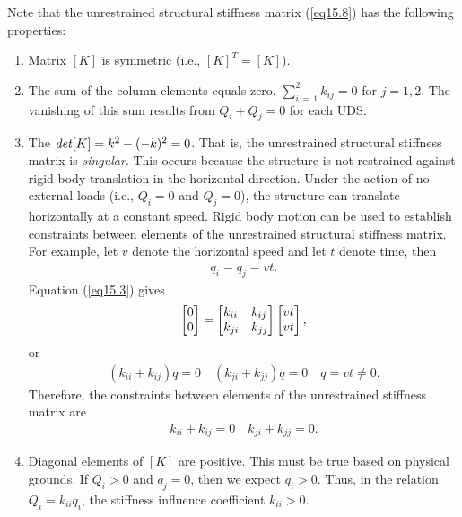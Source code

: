 \documentclass{AeroStructure-ERJohnson}
\begin{document}
Note that the unrestrained structural stiffness matrix (\ref{eq15.8}) has the following properties:
\begin{enumerate}
  \item Matrix $[K]$ is symmetric (i.e., $[K]^{T}=[K]$).
  \item The sum of the column elements equals zero. $\sum\limits_{i\,=\,1}^2 k_{i j}=0$ for $j=1,2$. The vanishing of this sum results from $Q_{i}+Q_{j}=0$ for each UDS.
  \item The ${\it det}[K]=k^{2}-(-k)^{2}=0$. That is, the unrestrained structural stiffness matrix is \textit{singular}. This occurs because the structure is not restrained against rigid body translation in the horizontal direction.
Under the action of no external loads (i.e., $Q_{i}=0$ and $Q_{j}=0$), the structure can translate horizontally at a constant speed. Rigid body motion can be used to establish constraints between elements of the unrestrained structural stiffness matrix. For example, let $v$ denote the horizontal speed and let $t$ denote time, then
\begin{align}\label{eq15.9}
q_{i}=q_{j}=v t.
\end{align}
Equation (\ref{eq15.3}) gives
\begin{align}\label{eq15.10}
\left[\begin{array}{@{}l@{}}0 \\0\end{array}\right]=\left[\begin{array}{@{}ll@{}}k_{i i} & k_{i j} \\k_{j i} & k_{j j}\end{array}\right]\left[\begin{array}{@{}l@{}}v t \\v t\end{array}\right],
\end{align}
or
\begin{align}\label{eq15.11}
(k_{i i}+k_{i j}) q=0 \quad (k_{j i}+k_{j j}) q=0 \quad q=v t \neq 0.
\end{align}
Therefore, the constraints between elements of the unrestrained stiffness matrix are
\begin{align}\label{eq15.12}
k_{i i}+k_{i j}=0 \quad k_{j i}+k_{j j}=0.
\end{align}


\item Diagonal elements of $[K]$ are positive. This must be true based on physical grounds. If $Q_{i}>0$ and $q_{j}=0$, then we expect $q_{i}>0$. Thus, in the relation $Q_{i}=k_{i i} q_{i}$, the stiffness influence coefficient $k_{i i}>0$.
\end{enumerate}
\end{document}
